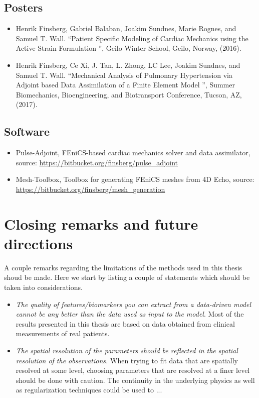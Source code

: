 \subsection{Posters}
\begin{itemize}
  \item Henrik Finsberg, Gabriel Balaban, Joakim Sundnes, Marie
    Rognes, and Samuel T. Wall. ``Patient Specific Modeling of Cardiac
    Mechanics using the Active Strain Formulation '',
    Geilo Winter School, Geilo, Norway, (2016).
  \item Henrik Finsberg, Ce Xi, J. Tan, L. Zhong, LC Lee, Joakim
    Sundnes, and Samuel T. Wall. ``Mechanical Analysis of Pulmonary
    Hypertension via Adjoint based Data Assimilation of a Finite
    Element Model '', Summer Biomechanics, Bioengineering, and
    Biotransport Conference, Tucson, AZ, (2017). 
  \end{itemize}


\subsection{Software}
\begin{itemize}
  \item Pulse-Adjoint, FEniCS-based cardiac mechanics solver and data
    assimilator, source: \url{https://bitbucket.org/finsberg/pulse_adjoint}
  \item Mesh-Toolbox, Toolbox for generating FEniCS meshes from 4D
    Echo,  source: \url{https://bitbucket.org/finsberg/mesh_generation}
\end{itemize}



\section{Closing remarks and future directions}

A couple remarks regarding the limitations of the methods used in this
thesis shoud be made. Here we start by listing a couple of statements
which should be taken into considerations. 


\begin{itemize}
\item \emph{The quality of features/biomarkers you can extract from a data-driven
model cannot be any better than the data used as input to the
model}. Most of the results presented in this thesis are based on data
obtained from clinical measurements of real patients.
\item \emph{The spatial resolution of the parameters should be
    reflected in the spatial resolution of the observations.} When
  trying to fit data that are spatially resolved at some level,
  choosing parameters that are resolved at a finer level should be
  done with caution. The continuity in the underlying physics as well
  as regularization techniques could be used to ...

\end{itemize}


